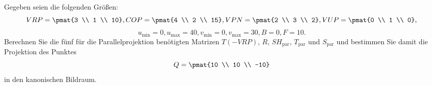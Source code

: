 %
Gegeben seien die folgenden Größen:
\[VRP = \pmat{3 \\ 1 \\ 10}, COP = \pmat{4 \\ 2 \\ 15},
VPN = \pmat{2 \\ 3 \\ 2}, VUP = \pmat{0 \\ 1 \\ 0},\]
\[u_\mathrm{min} = 0, u_\mathrm{max} = 40,
v_\mathrm{min} = 0, v_\mathrm{max} = 30, B = 0, F = 10.\]
Berechnen Sie die fünf für die Parallelprojektion benötigten Matrizen 
$T(-VRP)$, $R$, $SH_\mathrm{par}$, $T_\mathrm{par}$ und $S_\mathrm{par}$ 
und bestimmen Sie damit die Projektion des Punktes \\
\[Q = \pmat{10 \\ 10 \\ -10}\] in den kanonischen Bildraum.
